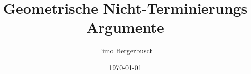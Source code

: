 \documentclass{beamer}
\title{Geometrische Nicht-Terminierungs Argumente}
\author{Timo Bergerbusch}
\date{\today}
\begin{document}
\maketitle
\frame{\tableofcontents}





\end{document}
